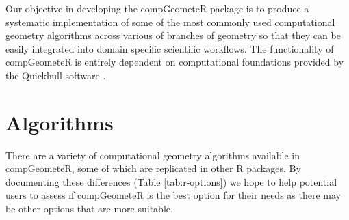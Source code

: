 \documentclass[12pt, a4paper]{article}
\begin{document}
Our objective in developing the compGeometeR package is to produce a systematic implementation of some of the most commonly used computational geometry algorithms across various of branches of geometry so that they can be easily integrated into domain specific scientific workflows.  The functionality of compGeometeR is entirely dependent on computational foundations provided by the Quickhull software \citep{barber-1996}.

\section{Algorithms}

There are a variety of computational geometry algorithms available in compGeometeR, some of which are replicated in other R packages.  By documenting these differences (Table \ref{tab:r-options}) we hope to help potential users to assess if compGeometeR is the best option for their needs as there may be other options that are more suitable.
\end{document}
